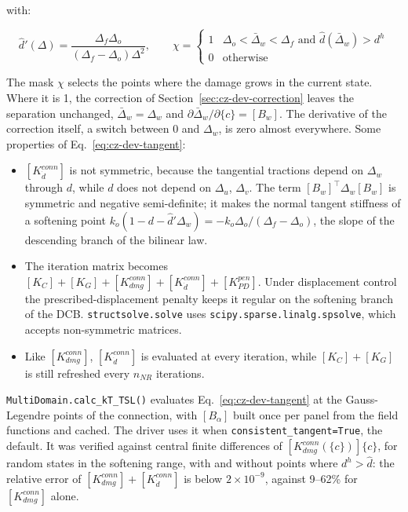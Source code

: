 \noindent with:

\begin{equation}\label{eq:cz-dev-dprime}
	\hat d'(\Delta) = \frac{\Delta_f \Delta_o}{(\Delta_f - \Delta_o) \Delta^2}, \qquad
	\chi = \begin{cases}
		1 & \Delta_o < \bar\Delta_w < \Delta_f \text{ and } \hat d(\bar\Delta_w) > d^h \\
		0 & \text{otherwise}
	\end{cases}
\end{equation}

\noindent The mask $\chi$ selects the points where the damage grows in the current state. Where it is 1, the correction of Section~\ref{sec:cz-dev-correction} leaves the separation unchanged, $\bar\Delta_w = \Delta_w$ and $\partial \bar\Delta_w / \partial \{c\} = [B_w]$. The derivative of the correction itself, a switch between 0 and $\Delta_w$, is zero almost everywhere. Some properties of Eq.~\ref{eq:cz-dev-tangent}:

\begin{itemize}
	\item $[K^{conn}_{\dot d}]$ is not symmetric, because the tangential tractions depend on $\Delta_w$ through $d$, while $d$ does not depend on $\Delta_u$, $\Delta_v$. The term $[B_w]^\top \Delta_w [B_w]$ is symmetric and negative semi-definite; it makes the normal tangent stiffness of a softening point $k_o (1 - d - \hat d' \Delta_w) = -k_o \Delta_o / (\Delta_f - \Delta_o)$, the slope of the descending branch of the bilinear law.
	\item The iteration matrix becomes $[K_C] + [K_G] + [K^{conn}_{dmg}] + [K^{conn}_{\dot d}] + [K^{pen}_{PD}]$. Under displacement control the prescribed-displacement penalty keeps it regular on the softening branch of the DCB. \texttt{structsolve.solve} uses \texttt{scipy.sparse.linalg.spsolve}, which accepts non-symmetric matrices.
	\item Like $[K^{conn}_{dmg}]$, $[K^{conn}_{\dot d}]$ is evaluated at every iteration, while $[K_C] + [K_G]$ is still refreshed every $n_{NR}$ iterations.
\end{itemize}

\texttt{MultiDomain.calc\_kT\_TSL()} evaluates Eq.~\ref{eq:cz-dev-tangent} at the Gauss-Legendre points of the connection, with $[B_\alpha]$ built once per panel from the field functions and cached. The driver uses it when \texttt{consistent\_tangent=True}, the default. It was verified against central finite differences of $[K^{conn}_{dmg}(\{c\})]\{c\}$, for random states in the softening range, with and without points where $d^h > \hat d$: the relative error of $[K^{conn}_{dmg}] + [K^{conn}_{\dot d}]$ is below $2 \times 10^{-9}$, against 9--62\% for $[K^{conn}_{dmg}]$ alone.


